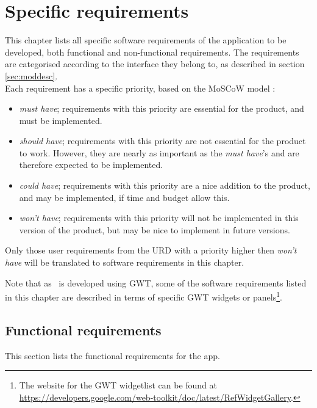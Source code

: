 \chapter{Specific requirements}
\label{chap:specreq}
This chapter lists all specific software requirements of the application to be developed, both functional and non-functional requirements. The requirements are categorised according to the interface they belong to, as described in section \ref{sec:moddesc}. \\
Each requirement has a specific priority, based on the MoSCoW model \cite{moscow}:

\begin{itemize}
    \item \emph{must have}; requirements with this priority are essential for the product, and must be implemented.
    \item \emph{should have}; requirements with this priority are not essential for the product to work. However, they are nearly as important as the \emph{must have}'s and are therefore expected to be implemented.
    \item \emph{could have}; requirements with this priority are a nice addition to the product, and may be implemented, if time and budget allow this.
    \item \emph{won't have}; requirements with this priority will not be implemented in this version of the product, but may be nice to implement in future versions.
\end{itemize}

Only those user requirements from the URD \cite{urd} with a priority higher then \emph{won't have} will be translated to software requirements in this chapter.

Note that as \applicationname\ is developed using GWT, some of the software requirements listed in this chapter are described in terms of specific GWT widgets or panels\footnote{The website for the GWT widgetlist can be found at \url{https://developers.google.com/web-toolkit/doc/latest/RefWidgetGallery}.}.


\section{Functional requirements}
\label{sec:funcreq}
This section lists the functional requirements for the \projectname app.

